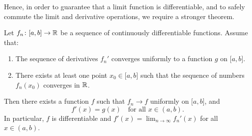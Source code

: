 \documentclass[../analysis1.tex]{subfiles}
\begin{document}
Hence, in order to guarantee that a limit function is differentiable, and to safely commute the limit and derivative operations, we require a stronger theorem.


\begin{theorem}
\label{thm:unifderivative}
    \begin{shaded*}
        Let $f_n \colon \lbrack a,b \rbrack \to \mathbb{R}$ be a sequence of continuously differentiable functions. Assume that:
        \begin{enumerate}
            \item The sequence of derivatives $f_n'$ converges uniformly to a function $g$ on $\lbrack a,b \rbrack$.
            \item There exists at least one point $x_0 \in \lbrack a,b \rbrack$ such that the sequence of numbers $f_n(x_0)$ converges in $\mathbb{R}$.
        \end{enumerate}
        Then there exists a function $f$ such that $f_n \to f$ uniformly on $\lbrack a,b \rbrack$, and
        \[
            f'(x) = g(x) \quad \text{for all } x \in (a,b).
        \]
        In particular, $f$ is differentiable and $f'(x) = \lim_{n \to \infty} f_n'(x)$ for all $x \in (a,b)$.
    \end{shaded*}
\end{theorem}
\end{document}
